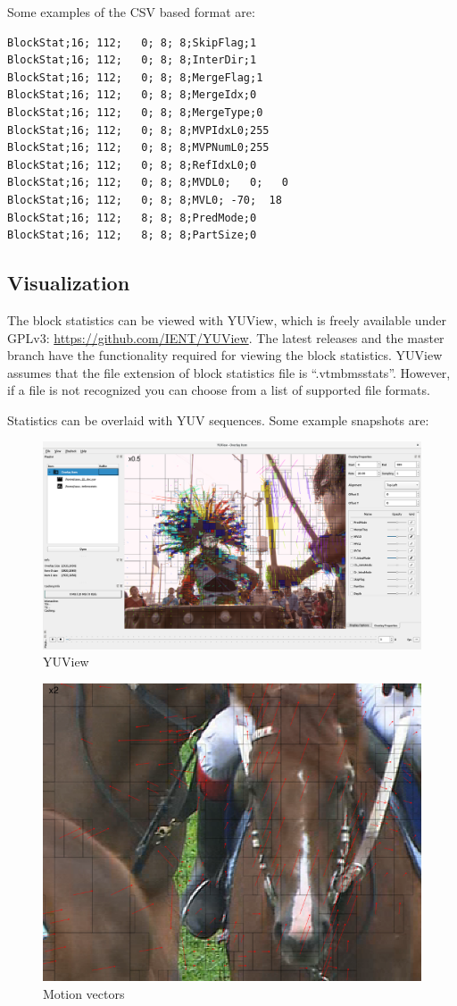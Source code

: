 \documentclass[a4paper,11pt]{jvetdoc}
\begin{document}
Some examples of the CSV based format are:
\begin{verbatim}
BlockStat;16; 112;   0; 8; 8;SkipFlag;1
BlockStat;16; 112;   0; 8; 8;InterDir;1
BlockStat;16; 112;   0; 8; 8;MergeFlag;1
BlockStat;16; 112;   0; 8; 8;MergeIdx;0
BlockStat;16; 112;   0; 8; 8;MergeType;0
BlockStat;16; 112;   0; 8; 8;MVPIdxL0;255
BlockStat;16; 112;   0; 8; 8;MVPNumL0;255
BlockStat;16; 112;   0; 8; 8;RefIdxL0;0
BlockStat;16; 112;   0; 8; 8;MVDL0;   0;   0
BlockStat;16; 112;   0; 8; 8;MVL0; -70;  18
BlockStat;16; 112;   8; 8; 8;PredMode;0
BlockStat;16; 112;   8; 8; 8;PartSize;0
\end{verbatim}

\subsection{Visualization}
\label{sec:visualization}

The block statistics can be viewed with YUView, which is freely available under
GPLv3: \url{https://github.com/IENT/YUView}. The latest releases and the master
branch have the functionality required for  viewing the block statistics. YUView
assumes that the file extension of block statistics file is
“.vtmbmsstats”. However, if a file is not recognized you can choose from a list
of supported file formats.


Statistics can be overlaid with YUV sequences. Some example snapshots are:

\begin{figure}[htpb]
  \centering
  \includegraphics[width=0.8\linewidth]{figures/YUView}
  \caption{YUView}
  \label{fig:yuview}
\end{figure}

\begin{figure}[htpb]
  \centering
  \includegraphics[width=0.5\linewidth]{figures/raceHorsesShot2MotionVectors}
  \caption{Motion vectors}
  \label{fig:motion-vectors}
\end{figure}
\end{document}
